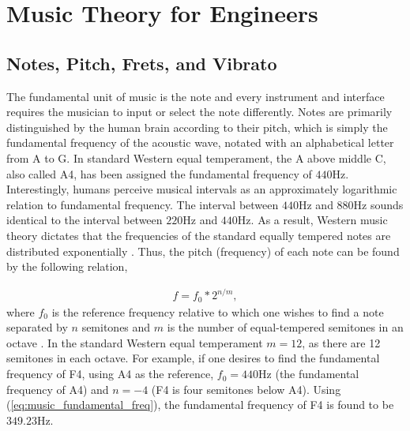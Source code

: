 \documentclass[10pt,journal,final]{IEEEtran}
\begin{document}
\section{Music Theory for Engineers}
\label{sec:music_theory_for_engineers}

\subsection{Notes, Pitch, Frets, and Vibrato}
\label{subsec:notes_pitch_and_virbrato}
The fundamental unit of music is the note and every instrument and interface requires the musician to input or select the note differently. Notes are primarily distinguished by the human brain according to their pitch, which is simply the fundamental frequency of the acoustic wave, notated with an alphabetical letter from A to G. In standard Western equal temperament, the A above middle C, also called A4, has been assigned the fundamental frequency of $440$Hz. Interestingly, humans perceive musical intervals as an approximately logarithmic relation to fundamental frequency. The interval between $440$Hz and $880$Hz sounds identical to the interval between $220$Hz and $440$Hz. As a result, Western music theory dictates that the frequencies of the standard equally tempered notes are distributed exponentially \cite{music:Helmholtz}. Thus, the pitch (frequency) of each note can be found by the following relation,

\begin{gather}
	\label{eq:music_fundamental_freq}
	f = f_0 * 2^{n/m},
\end{gather}
where $f_0$ is the reference frequency relative to which one wishes to find a note separated by $n$ semitones and $m$ is the number of equal-tempered semitones in an octave \cite{music:basic_music_theory}. In the standard Western equal temperament $m = 12$, as there are 12 semitones in each octave. For example, if one desires to find the fundamental frequency of F4, using A4 as the reference, $f_0 = 440$Hz (the fundamental frequency of A4) and $n = -4$ (F4 is four semitones below A4). Using (\ref{eq:music_fundamental_freq}), the fundamental frequency of F4 is found to be $349.23$Hz.
\end{document}

